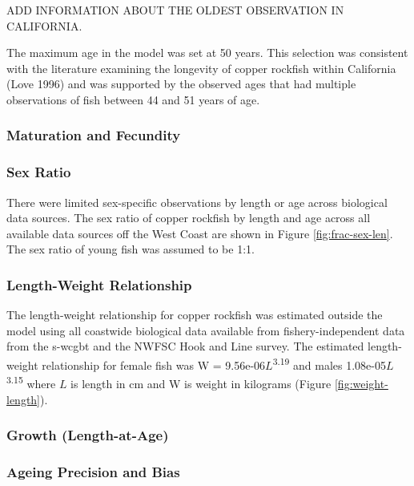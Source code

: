 \documentclass[11pt,
  english,
  letterpaper,
]{article}
\begin{document}
ADD INFORMATION ABOUT THE OLDEST OBSERVATION IN CALIFORNIA.

The maximum age in the model was set at 50 years. This selection was consistent with the literature examining the longevity of copper rockfish within California (Love 1996) and was supported by the observed ages that had multiple observations of fish between 44 and 51 years of age.

\hypertarget{maturation-and-fecundity}{%
\subsubsection{Maturation and Fecundity}\label{maturation-and-fecundity}}

\hypertarget{sex-ratio}{%
\subsubsection{Sex Ratio}\label{sex-ratio}}

There were limited sex-specific observations by length or age across biological data sources. The sex ratio of copper rockfish by length and age across all available data sources off the West Coast are shown in Figure \ref{fig:frac-sex-len}. The sex ratio of young fish was assumed to be 1:1.

\hypertarget{length-weight-relationship}{%
\subsubsection{Length-Weight Relationship}\label{length-weight-relationship}}

The length-weight relationship for copper rockfish was estimated outside the model using all coastwide biological data available from fishery-independent data from the \gls{s-wcgbt} and the NWFSC Hook and Line survey. The estimated length-weight relationship for female fish was W = 9.56e-06\(L\)\textsuperscript{3.19} and males 1.08e-05\(L\)\textsuperscript{3.15} where \(L\) is length in cm and W is weight in kilograms (Figure \ref{fig:weight-length}).

\hypertarget{growth-length-at-age}{%
\subsubsection{Growth (Length-at-Age)}\label{growth-length-at-age}}

\hypertarget{ageing-precision-and-bias}{%
\subsubsection{Ageing Precision and Bias}\label{ageing-precision-and-bias}}
\end{document}
